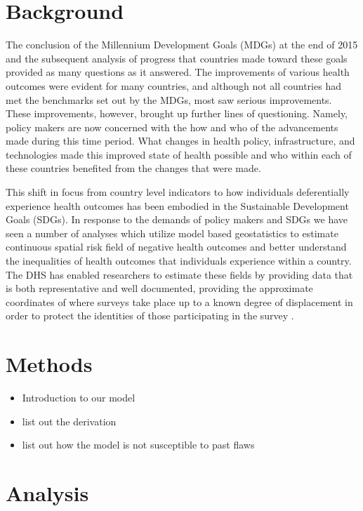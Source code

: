 \documentclass{article}
\begin{document}
\section{Background}\label{background}

The conclusion of the Millennium Development Goals (MDGs) at the end of 2015 and the subsequent analysis of progress that countries made toward these goals provided as many questions as it answered. The improvements of various health outcomes were evident for many countries, and although not all countries had met the benchmarks set out by the MDGs, most saw serious improvements. These improvements, however, brought up further lines of questioning. Namely, policy makers are now concerned with the how and who of the advancements made during this time period. What changes in health policy, infrastructure, and technologies made this improved state of health possible and who within each of these countries benefited from the changes that were made. 

This shift in focus from country level indicators to how individuals deferentially experience health outcomes has been embodied in the Sustainable Development Goals (SDGs). In response to the demands of policy makers and SDGs we have seen a number of analyses which utilize model based geostatistics to estimate continuous spatial risk field of negative health outcomes and better understand the inequalities of health outcomes that individuals experience within a country. The DHS has enabled researchers to estimate these fields by providing data that is both representative and well documented, providing the approximate coordinates of where surveys take place up to a known degree of displacement in order to protect the identities of those participating in the survey \cite{Burgert-Brucker2016, Gething2015}. 

\section{Methods}\label{methods}

\begin{itemize}
\item Introduction to our model
\item list out the derivation
\item list out how the model is not susceptible to past flaws
\end{itemize}

\section{Analysis}\label{analysis}
\end{document}

